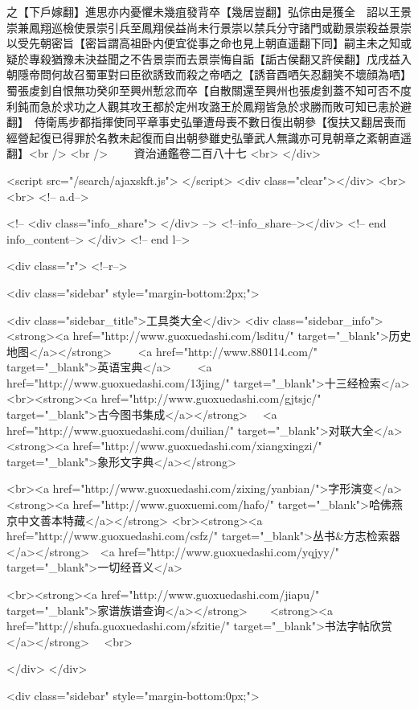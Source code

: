 之【下戶嫁翻】進思亦内憂懼未幾疽發背卒【幾居豈翻】弘倧由是獲全　詔以王景崇兼鳳翔巡檢使景崇引兵至鳳翔侯益尚未行景崇以禁兵分守諸門或勸景崇殺益景崇以受先朝密旨【密旨謂高祖卧内便宜從事之命也見上朝直遥翻下同】嗣主未之知或疑於專殺猶豫未決益聞之不告景崇而去景崇悔自詬【詬古侯翻又許侯翻】戊戌益入朝隱帝問何故召蜀軍對曰臣欲誘致而殺之帝哂之【誘音酉哂矢忍翻笑不壞顔為哂】　蜀張䖍釗自恨無功癸卯至興州慙忿而卒【自散關還至興州也張䖍釗蓋不知可否不度利鈍而急於求功之人觀其攻王都於定州攻潞王於鳳翔皆急於求勝而敗可知已恚於避翻】　侍衛馬步都指揮使同平章事史弘肇遭母喪不數日復出朝參【復扶又翻居喪而經營起復已得罪於名教未起復而自出朝參雖史弘肇武人無識亦可見朝章之紊朝直遥翻】<br />
<br />
　　資治通鑑卷二百八十七  <br>
   </div> 

<script src="/search/ajaxskft.js"> </script>
 <div class="clear"></div>
<br>
<br>
 <!-- a.d-->

 <!--
<div class="info_share">
</div> 
-->
 <!--info_share--></div>   <!-- end info_content-->
  </div> <!-- end l-->

<div class="r">   <!--r-->



<div class="sidebar"  style="margin-bottom:2px;">

 
<div class="sidebar_title">工具类大全</div>
<div class="sidebar_info">
<strong><a href="http://www.guoxuedashi.com/lsditu/" target="_blank">历史地图</a></strong>　　
<a href="http://www.880114.com/" target="_blank">英语宝典</a>　　
<a href="http://www.guoxuedashi.com/13jing/" target="_blank">十三经检索</a>　
<br><strong><a href="http://www.guoxuedashi.com/gjtsjc/" target="_blank">古今图书集成</a></strong>　
<a href="http://www.guoxuedashi.com/duilian/" target="_blank">对联大全</a>　<strong><a href="http://www.guoxuedashi.com/xiangxingzi/" target="_blank">象形文字典</a></strong>　

<br><a href="http://www.guoxuedashi.com/zixing/yanbian/">字形演变</a>　　<strong><a href="http://www.guoxuemi.com/hafo/" target="_blank">哈佛燕京中文善本特藏</a></strong>
<br><strong><a href="http://www.guoxuedashi.com/csfz/" target="_blank">丛书&方志检索器</a></strong>　<a href="http://www.guoxuedashi.com/yqjyy/" target="_blank">一切经音义</a>　　

<br><strong><a href="http://www.guoxuedashi.com/jiapu/" target="_blank">家谱族谱查询</a></strong>　　<strong><a href="http://shufa.guoxuedashi.com/sfzitie/" target="_blank">书法字帖欣赏</a></strong>　
<br>

</div>
</div>


<div class="sidebar" style="margin-bottom:0px;">

